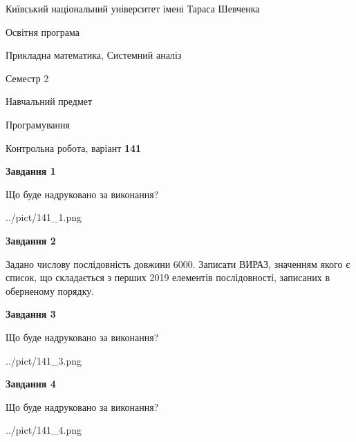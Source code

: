 \documentclass[12pt, ukrainian]{article}
\begin{document}
{{\begin {small}\par
{ \center  Київський національний університет імені Тараса Шевченка \par}
{\parbox {5 cm}{Освітня програма \hfill}{\parbox {8 cm}{Прикладна математика, Системний аналіз \hfill}}\parbox {5 cm}{\hfill Семестр 2}}\par
{\parbox {5 cm} {Навчальний предмет \hfill}\parbox {7 cm}{Програмування \hfill}\parbox {6cm}{\hfill}\par}\vspace{-7pt} \end{small}}{\center Контрольна робота, варіант  \No \textbf
{ 141 }\par}}
{
\begin {large}
{\begin {center}\textbf{Завдання 1}\end {center}}\par
Що буде надруковано за виконання?\par\par
\begin{center}
	{../pict/141_1.png}
\end{center}
\newpage

{\begin {center}\textbf{Завдання 2}\end {center}}\par

 Задано числову послідовність  довжини 6000. Записати ВИРАЗ, значенням якого є список, що складається з перших 2019 елементів послідовності, записаних в обернено\-му порядку.\par
\newpage

{\begin {center}\textbf{Завдання 3}\end {center}}\par
Що буде надруковано за виконання?
\begin{center}
	{../pict/141_3.png}
\end{center}
\newpage

{\begin {center}\textbf{Завдання 4}\end {center}}\par
Що буде надруковано за виконання?\par
\begin{center}
	{../pict/141_4.png}
\end{center}
\newpage


\end{large}}
\end{document}

